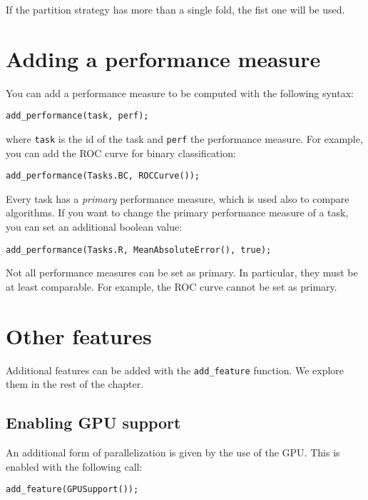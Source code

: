 \noindent If the partition strategy has more than a single fold, the fist one will be used.

\section{Adding a performance measure}

You can add a performance measure to be computed with the following syntax:

\begin{lstlisting}
add_performance(task, perf);
\end{lstlisting}

\noindent where \verb|task| is the id of the task and \verb|perf| the performance measure. For example, you can add the ROC curve for binary classification:

\begin{lstlisting}
add_performance(Tasks.BC, ROCCurve());
\end{lstlisting}

\noindent Every task has a \textit{primary} performance measure, which is used also to compare algorithms. If you want to change the primary performance measure of a task, you can set an additional boolean value:

\begin{lstlisting}
add_performance(Tasks.R, MeanAbsoluteError(), true);
\end{lstlisting}

\noindent Not all performance measures can be set as primary. In particular, they must be at least comparable. For example, the ROC curve cannot be set as primary.

\section{Other features}

Additional features can be added with the \verb|add_feature| function. We explore them in the rest of the chapter.

\subsection{Enabling GPU support}

An additional form of parallelization is given by the use of the GPU. This is enabled with the following call:

\begin{lstlisting}
add_feature(GPUSupport());
\end{lstlisting}

